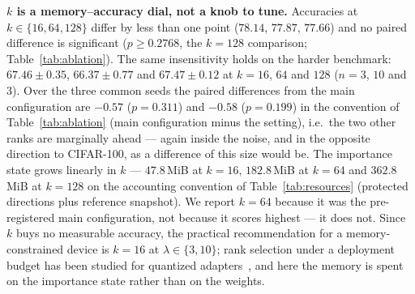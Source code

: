 \textbf{$k$ is a memory--accuracy dial, not a knob to tune.} Accuracies at
$k\in\{16,64,128\}$ differ by less than one point ($78.14$, $77.87$, $77.66$) and no paired
difference is significant ($p\ge0.2768$, the $k{=}128$ comparison; Table~\ref{tab:ablation}).
The same insensitivity holds on the harder benchmark: $67.46\pm0.35$, $66.37\pm0.77$ and
$67.47\pm0.12$ at $k=16$, $64$ and $128$ ($n=3$, $10$ and $3$). Over the three common seeds
the paired differences from the main configuration are $-0.57$ ($p=0.311$) and $-0.58$
($p=0.199$) in the convention of Table~\ref{tab:ablation} (main configuration minus the
setting), i.e.\ the two other ranks are marginally ahead --- again inside the noise, and in
the opposite direction to CIFAR-100, as a difference of this size would be.
The importance state grows linearly in $k$ --- $47.8$\,MiB at $k{=}16$, $182.8$\,MiB
at $k{=}64$ and $362.8$\,MiB at $k{=}128$ on the accounting convention of
Table~\ref{tab:resources} (protected directions plus reference snapshot). We
report $k{=}64$ because it was the pre-registered main configuration, not because it
scores highest --- it does not. Since $k$ buys no measurable accuracy, the practical
recommendation for a memory-constrained device is $k{=}16$ at $\lambda\in\{3,10\}$; rank
selection under a deployment budget has been studied for quantized adapters~\cite{bayattoksoz2026sqlora},
and here the memory is spent on the importance state rather than on the weights.

